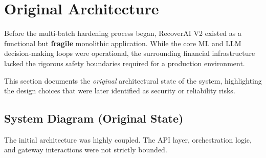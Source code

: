 
\section{Original Architecture}

\begin{tcolorbox}[summarybox={\iconGear[1.5] The Baseline System}]
\color{textdark}
Before the multi-batch hardening process began, RecoverAI V2 existed as a functional but \textbf{fragile} monolithic application. While the core ML and LLM decision-making loops were operational, the surrounding financial infrastructure lacked the rigorous safety boundaries required for a production environment. 

This section documents the \textit{original} architectural state of the system, highlighting the design choices that were later identified as security or reliability risks.
\end{tcolorbox}

\vspace{0.8cm}

\subsection{System Diagram (Original State)}

The initial architecture was highly coupled. The API layer, orchestration logic, and gateway interactions were not strictly bounded.

